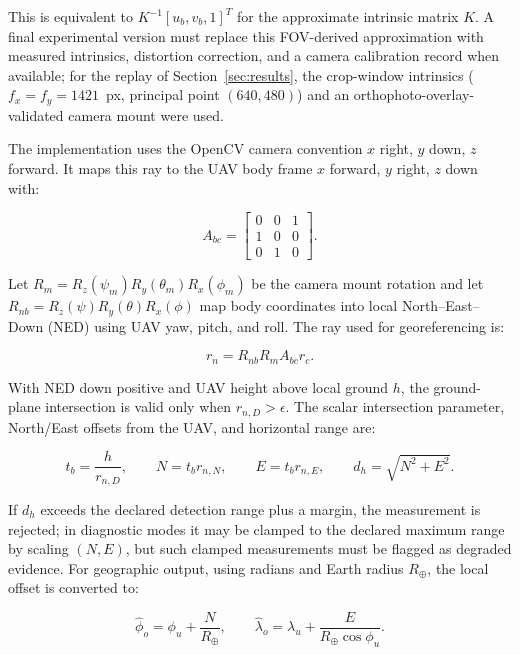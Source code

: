 \documentclass[fleqn]{VRIH2025}
\begin{document}
This is equivalent to \(K^{-1}[u_b,v_b,1]^T\) for the approximate intrinsic matrix \(K\). A final experimental version must replace this FOV-derived approximation with measured intrinsics, distortion correction, and a camera calibration record when available; for the replay of Section~\ref{sec:results}, the crop-window intrinsics ($f_x{=}f_y{=}1421$~px, principal point $(640,480)$) and an orthophoto-overlay-validated camera mount were used.

The implementation uses the OpenCV camera convention \(x\) right, \(y\) down, \(z\) forward. It maps this ray to the UAV body frame \(x\) forward, \(y\) right, \(z\) down with:

\begin{equation}
A_{bc} =
\begin{bmatrix}
0&0&1\\
1&0&0\\
0&1&0
\end{bmatrix}.
\label{eq:camera-body-align}
\end{equation}

Let \(R_m=R_z(\psi_m)R_y(\theta_m)R_x(\phi_m)\) be the camera mount rotation and let \(R_{nb}=R_z(\psi)R_y(\theta)R_x(\phi)\) map body coordinates into local North--East--Down (NED) using UAV yaw, pitch, and roll. The ray used for georeferencing is:

\begin{equation}
r_n = R_{nb} R_m A_{bc} r_c.
\label{eq:ned-ray}
\end{equation}

With NED down positive and UAV height above local ground \(h\), the ground-plane intersection is valid only when \(r_{n,D}>\epsilon\). The scalar intersection parameter, North/East offsets from the UAV, and horizontal range are:

\begin{equation}
t_b = \frac{h}{r_{n,D}},\qquad
N=t_b r_{n,N},\qquad
E=t_b r_{n,E},\qquad
d_h=\sqrt{N^2+E^2}.
\label{eq:ground-intersection}
\end{equation}

If \(d_h\) exceeds the declared detection range plus a margin, the measurement is rejected; in diagnostic modes it may be clamped to the declared maximum range by scaling \((N,E)\), but such clamped measurements must be flagged as degraded evidence. For geographic output, using radians and Earth radius \(R_\oplus\), the local offset is converted to:

\begin{equation}
\hat{\phi}_o=\phi_u+\frac{N}{R_\oplus},\qquad
\hat{\lambda}_o=\lambda_u+\frac{E}{R_\oplus\cos\phi_u}.
\label{eq:latlon-offset}
\end{equation}
\end{document}

